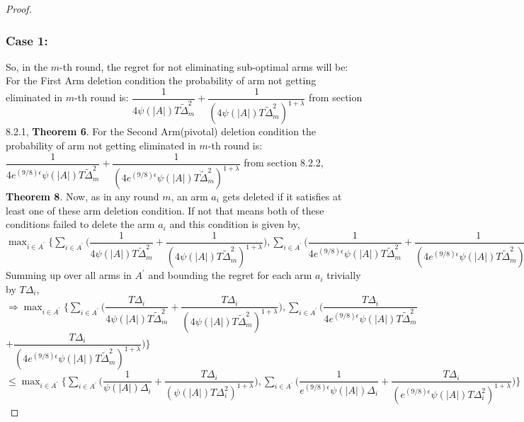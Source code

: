 \begin{proof}
\subsubsection{\textbf{Case 1:}}
So, in the $m$-th round, the regret for not eliminating sub-optimal arms will be:
\newline
For the First Arm deletion condition the probability of arm not getting eliminated in $m$-th round is: $\dfrac{1}{4\psi(|A|)T\tilde{\Delta}_{m}^{2}} + \dfrac{1}{(4\psi(|A|)T\tilde{\Delta}_{m}^{2})^{1+\lambda}}$ from section 8.2.1, \textbf{Theorem 6}.
\newline
For the Second Arm(pivotal) deletion condition the probability of arm not getting eliminated in $m$-th round is: $\dfrac{1}{4 e^{(9/8)\epsilon} \psi(|A|)T\tilde{\Delta}_{m}^{2}} + \dfrac{1}{(4 e^{(9/8)\epsilon} \psi(|A|)T\tilde{\Delta}_{m}^{2})^{1+\lambda}}$ from section 8.2.2, \textbf{Theorem 8}.
\newline
\newline
Now, as in any round $m$, an arm $a_{i}$ gets deleted if it satisfies at least one of these arm deletion condition. If not that means both of these conditions failed to delete the arm $a_{i}$ and this condition is given by,
\newline 
$\max_{i\in A^{'}}\bigg\lbrace\sum_{i\in A^{'}}\bigg(\dfrac{1}{4\psi(|A|)T\tilde{\Delta}_{m}^{2}} + \dfrac{1}{(4\psi(|A|)T\tilde{\Delta}_{m}^{2})^{1+\lambda}}\bigg) ,\sum_{i\in A^{'}}\bigg(\dfrac{1}{4 e^{(9/8)\epsilon} \psi(|A|)T\tilde{\Delta}_{m}^{2}} + \dfrac{1}{(4 e^{(9/8)\epsilon} \psi(|A|)T\tilde{\Delta}_{m}^{2})^{1+\lambda}}\bigg)\bigg\rbrace$
\newline
\newline Summing up over all arms in $A^{'}$ and bounding the regret for each arm $a_{i}$ trivially by $T\Delta_{i}$,
\newline 
$\Rightarrow \max_{i\in A^{'}}\bigg\lbrace\sum_{i\in A^{'}} \bigg(\dfrac{T\Delta_{i}}{4\psi(|A|)T\tilde{\Delta}_{m}^{2}} + \dfrac{T\Delta_{i}}{(4\psi(|A|)T\tilde{\Delta}_{m}^{2})^{1+\lambda}}\bigg),\sum_{i\in A^{'}}\bigg(\dfrac{T\Delta_{i}}{4 e^{(9/8)\epsilon} \psi(|A|)T\tilde{\Delta}_{m}^{2}} $\newline\hspace*{20em}$+ \dfrac{T\Delta_{i}}{(4 e^{(9/8)\epsilon} \psi(|A|)T\tilde{\Delta}_{m}^{2})^{1+\lambda}}\bigg)\bigg\rbrace$
\newline
$\leq \max_{i\in A^{'}}\bigg\lbrace\sum_{i\in A^{'}} \bigg(\dfrac{1}{\psi(|A|)\Delta_{i}} + \dfrac{T\Delta_{i}}{(\psi(|A|)T\Delta_{i}^{2})^{1+\lambda}}\bigg) ,\sum_{i\in A^{'}}\bigg(\dfrac{1}{ e^{(9/8)\epsilon} \psi(|A|)\Delta_{i}} + \dfrac{T\Delta_{i}}{(e^{(9/8)\epsilon} \psi(|A|)T\Delta_{i}^{2})^{1+\lambda}}\bigg)\bigg\rbrace$

\end{proof}
